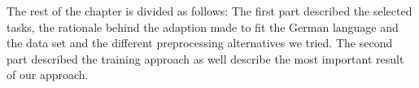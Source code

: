 The rest of the chapter is divided as follows: The first part described the
selected tasks, the rationale behind the adaption made to fit the German
language and the data set  and the different preprocessing alternatives we
tried. The second part described the training approach as well describe the most
important result of our approach.
















